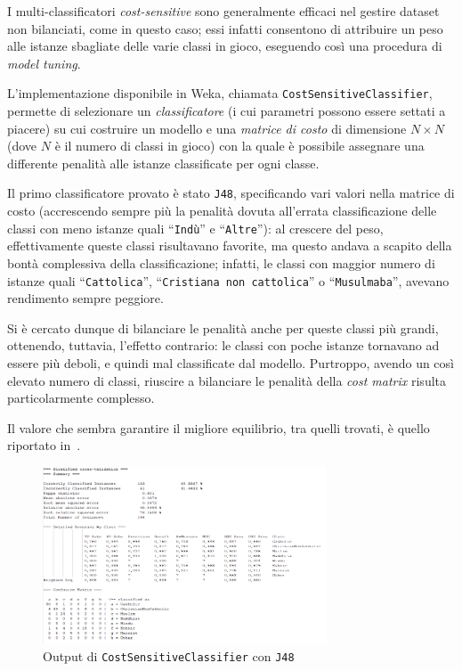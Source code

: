 \documentclass[a4paper,11pt,twoside,notitlepage,final]{scrartcl}
\begin{document}
I multi-classificatori \emph{cost-sensitive} sono generalmente efficaci nel gestire dataset non bilanciati, come in questo caso;
essi infatti consentono di attribuire un peso alle istanze sbagliate delle varie classi in gioco, eseguendo così una procedura di \emph{model tuning}.

L'implementazione disponibile in Weka, chiamata \texttt{CostSensitiveClassifier},
permette di selezionare un \emph{classificatore} (i cui parametri possono essere settati a piacere) su cui costruire un modello
e una \emph{matrice di costo} di dimensione \(N×N\) (dove \(N\) è il numero di classi in gioco) con la quale è possibile assegnare una differente penalità alle istanze classificate per ogni classe.

Il primo classificatore provato è stato \texttt{J48}, specificando vari valori nella matrice di costo (accrescendo sempre più la penalità dovuta all'errata classificazione delle classi con meno istanze quali ``\texttt{Indù}'' e ``\texttt{Altre}''):
al crescere del peso, effettivamente queste classi risultavano favorite, ma questo andava a scapito della bontà complessiva della classificazione; infatti, le classi con maggior numero di istanze quali ``\texttt{Cattolica}'', ``\texttt{Cristiana non cattolica}'' o ``\texttt{Musulmaba}'', avevano rendimento sempre peggiore.

Si è cercato dunque di bilanciare le penalità anche per queste classi più grandi, ottenendo, tuttavia, l'effetto contrario: le classi con poche istanze tornavano ad essere più deboli, e quindi mal classificate dal modello.
Purtroppo, avendo un così elevato numero di classi, riuscire a bilanciare le penalità della \emph{cost matrix} risulta particolarmente complesso.

Il valore che sembra garantire il migliore equilibrio, tra quelli trovati, è quello riportato in~.

\begin{figure}[H]
  \centering
  \includegraphics[width=0.75\textwidth]{fig/MultiJ48.PNG}%
  \caption{Output di \texttt{CostSensitiveClassifier} con \texttt{J48}}%
  \label{fig:cost:j48}
\end{figure}
\end{document}
